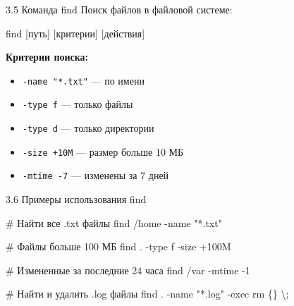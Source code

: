 \documentclass[
  ignorenonframetext,
  aspectratio=169,
  russian,
]{beamer}
\newenvironment{Shaded}{\begin{snugshade}}{\end{snugshade}}
\newcommand{\AttributeTok}[1]{\textcolor[rgb]{0.40,0.45,0.13}{#1}}
\newcommand{\CommentTok}[1]{\textcolor[rgb]{0.37,0.37,0.37}{#1}}
\newcommand{\DataTypeTok}[1]{\textcolor[rgb]{0.68,0.00,0.00}{#1}}
\newcommand{\FunctionTok}[1]{\textcolor[rgb]{0.28,0.35,0.67}{#1}}
\newcommand{\NormalTok}[1]{\textcolor[rgb]{0.00,0.23,0.31}{#1}}
\newcommand{\PreprocessorTok}[1]{\textcolor[rgb]{0.68,0.00,0.00}{#1}}
\newcommand{\SpecialStringTok}[1]{\textcolor[rgb]{0.13,0.47,0.30}{#1}}
\newcommand{\StringTok}[1]{\textcolor[rgb]{0.13,0.47,0.30}{#1}}
\providecommand{\tightlist}{%
  \setlength{\itemsep}{0pt}\setlength{\parskip}{0pt}}
\begin{document}
\begin{frame}[fragile]{3.5 Команда find}
\label{ux43aux43eux43cux430ux43dux434ux430-find}
Поиск файлов в файловой системе:

\begin{Shaded}
\begin{Highlighting}[]
\FunctionTok{find} \PreprocessorTok{[}\SpecialStringTok{путь}\PreprocessorTok{]} \PreprocessorTok{[}\SpecialStringTok{критерии}\PreprocessorTok{]} \PreprocessorTok{[}\SpecialStringTok{действия}\PreprocessorTok{]}
\end{Highlighting}
\end{Shaded}

\textbf{Критерии поиска:}

\begin{itemize}[<+->]
\tightlist
\item
  \texttt{-name\ "*.txt"} --- по имени
\item
  \texttt{-type\ f} --- только файлы
\item
  \texttt{-type\ d} --- только директории
\item
  \texttt{-size\ +10M} --- размер больше 10 МБ
\item
  \texttt{-mtime\ -7} --- изменены за 7 дней
\end{itemize}
\end{frame}

\begin{frame}[fragile]{3.6 Примеры использования find}
\label{ux43fux440ux438ux43cux435ux440ux44b-ux438ux441ux43fux43eux43bux44cux437ux43eux432ux430ux43dux438ux44f-find}
\begin{Shaded}
\begin{Highlighting}[]
\CommentTok{\# Найти все .txt файлы}
\FunctionTok{find}\NormalTok{ /home }\AttributeTok{{-}name} \StringTok{"*.txt"}

\CommentTok{\# Файлы больше 100 МБ}
\FunctionTok{find}\NormalTok{ . }\AttributeTok{{-}type}\NormalTok{ f }\AttributeTok{{-}size}\NormalTok{ +100M}

\CommentTok{\# Измененные за последние 24 часа}
\FunctionTok{find}\NormalTok{ /var }\AttributeTok{{-}mtime} \AttributeTok{{-}1}

\CommentTok{\# Найти и удалить .log файлы}
\FunctionTok{find}\NormalTok{ . }\AttributeTok{{-}name} \StringTok{"*.log"} \AttributeTok{{-}exec}\NormalTok{ rm \{\} }\DataTypeTok{\textbackslash{};}
\end{Highlighting}
\end{Shaded}
\end{frame}
\end{document}
